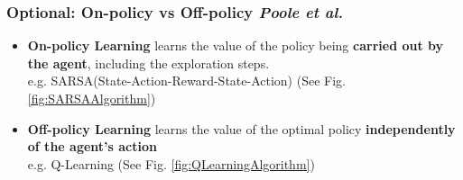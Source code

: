 \documentclass{beamer}
\begin{document}
    \begin{frame}
      \frametitle{Optional: On-policy vs Off-policy \scriptsize{\textit{Poole et al.}}}
      \begin{itemize}
        \item \textbf{On-policy Learning} learns the value of the policy being \textbf{carried out by the agent}, including the exploration steps. \\
              e.g. SARSA(State-Action-Reward-State-Action) (See Fig. \ref{fig:SARSAAlgorithm})
        \pause
        \item \textbf{Off-policy Learning} learns the value of the optimal policy \textbf{independently of the agent's action} \\
              e.g. Q-Learning (See Fig. \ref{fig:QLearningAlgorithm})
      \end{itemize}
    \end{frame}
\end{document}
